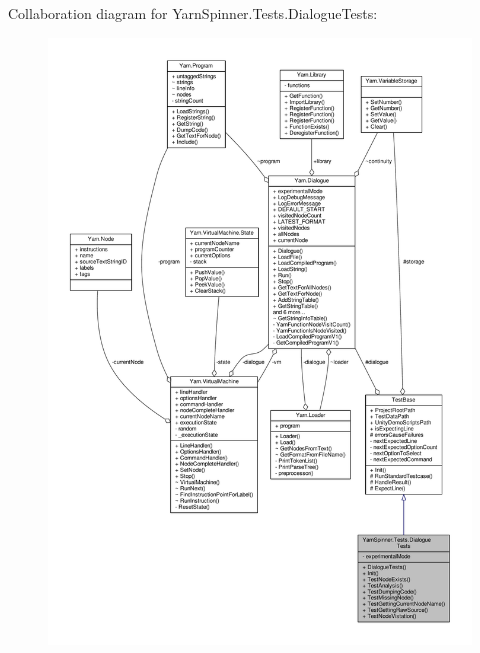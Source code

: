 Collaboration diagram for Yarn\-Spinner.\-Tests.\-Dialogue\-Tests\-:
\nopagebreak
\begin{figure}[H]
\begin{center}
\leavevmode
\includegraphics[width=350pt]{a00805}
\end{center}
\end{figure}
